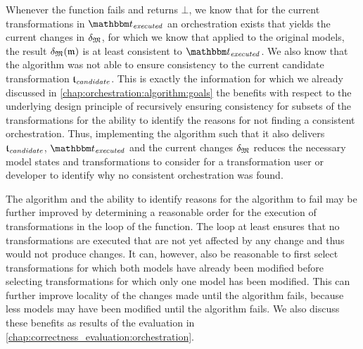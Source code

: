 Whenever the  function fails and returns $\bot$, we know that for the current transformations in $\provalgexecuted$ an orchestration exists that yields the current changes in $\changetuple{\metamodeltuple{M}}$, %
for which we know that applied to the original models, the result $\changetuple{\metamodeltuple{M}}(\modeltuple{m})$ %
is at least consistent to $\provalgexecuted$.
We also know that the algorithm was not able to ensure consistency to the current candidate transformation $\provalgcandidate$.
This is exactly the information for which we already discussed in \autoref{chap:orchestration:algorithm:goals} the benefits with respect to the underlying design principle of recursively ensuring consistency for subsets of the transformations for the ability to identify the reasons for not finding a consistent orchestration.
Thus, implementing the algorithm such that it also delivers $\provalgcandidate$, $\provalgexecuted$ and the current changes $\changetuple{\metamodeltuple{M}}$ reduces the necessary model states and transformations to consider for a transformation user or developer to identify why no consistent orchestration was found.


The algorithm and the ability to identify reasons for the algorithm to fail may be further improved by determining a reasonable order for the execution of transformations in the loop of the  function.
The loop at least ensures that no transformations are executed that are not yet affected by any change and thus would not produce changes.
It can, however, also be reasonable to first select transformations for which both models have already been modified before selecting transformations for which only one model has been modified.
This can further improve locality of the changes made until the algorithm fails, because less models may have been modified until the algorithm fails.
We also discuss these benefits as results of the evaluation in \autoref{chap:correctness_evaluation:orchestration}.



